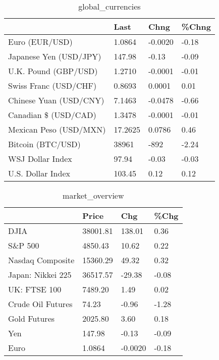 \documentclass{article}%
\begin{document}
%


\begin{table}[htbp]%
\caption{global\_currencies}%
\centering%
\begin{adjustbox}{width=1\textwidth}%
\begin{tabular}{llll}
\toprule
                       &    Last &    Chng & \%Chng \\
\midrule
        Euro (EUR/USD) &  1.0864 & -0.0020 & -0.18 \\
Japanese Yen (USD/JPY) &  147.98 &   -0.13 & -0.09 \\
  U.K. Pound (GBP/USD) &  1.2710 & -0.0001 & -0.01 \\
 Swiss Franc (USD/CHF) &  0.8693 &  0.0001 &  0.01 \\
Chinese Yuan (USD/CNY) &  7.1463 & -0.0478 & -0.66 \\
  Canadian \$ (USD/CAD) &  1.3478 & -0.0001 & -0.01 \\
Mexican Peso (USD/MXN) & 17.2625 &  0.0786 &  0.46 \\
     Bitcoin (BTC/USD) &   38961 &    -892 & -2.24 \\
      WSJ Dollar Index &   97.94 &   -0.03 & -0.03 \\
     U.S. Dollar Index &  103.45 &    0.12 &  0.12 \\
\bottomrule
\end{tabular}
%
\end{adjustbox}%
\end{table}

%


\begin{table}[htbp]%
\caption{market\_overview}%
\centering%
\begin{adjustbox}{width=1\textwidth}%
\begin{tabular}{llll}
\toprule
                  &    Price &     Chg &  \%Chg \\
\midrule
             DJIA & 38001.81 &  138.01 &  0.36 \\
          S\&P 500 &  4850.43 &   10.62 &  0.22 \\
 Nasdaq Composite & 15360.29 &   49.32 &  0.32 \\
Japan: Nikkei 225 & 36517.57 &  -29.38 & -0.08 \\
     UK: FTSE 100 &  7489.20 &    1.49 &  0.02 \\
Crude Oil Futures &    74.23 &   -0.96 & -1.28 \\
     Gold Futures &  2025.80 &    3.60 &  0.18 \\
              Yen &   147.98 &   -0.13 & -0.09 \\
             Euro &   1.0864 & -0.0020 & -0.18 \\
\bottomrule
\end{tabular}
%
\end{adjustbox}%
\end{table}

%
\end{document}
